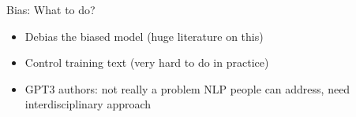 
\begin{vbframe}{Bias: What to do?}

\vfill

  \begin{itemize}
\item Debias the biased model (huge literature on this)
\item Control training text (very hard to do in practice)
\item GPT3 authors: not really a problem NLP people
can address, need interdisciplinary approach
    \end{itemize}

\vfill

\end{vbframe}

\endlecture

